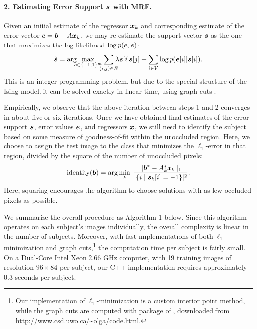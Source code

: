\paragraph{2. Estimating Error Support $\boldsymbol{s}$ with MRF.} 
Given an initial estimate of the regressor ${\boldsymbol{x}}_k$ and corresponding estimate of the error vector $\boldsymbol{e} = \boldsymbol{b} - A {\boldsymbol{x}}_k$, we may re-estimate the support vector $\boldsymbol{s}$ as the one that maximizes the log likelihood $\log p(\boldsymbol{e},\boldsymbol{s})$:\vspace{0mm}
\begin{equation}
\hat{\s} = \arg\hspace{-2mm}\max_{\s \in \{-1,1\}^m}\hspace{-2mm} \sum_{(i,j)\in E} \hspace{-2mm} \lambda \s[i]\s[j] +
\sum_{i\in V} \log p(\e[i] | \s[i]). \vspace{0mm}
\end{equation}
This is an integer programming problem, but due to the special structure of the Ising model, it can be solved exactly in linear time, using graph cuts \cite{Kolmogorov2004-PAMI}.

Empirically, we observe that the above iteration between steps 1 and 2 converges in about five or six iterations. Once we have obtained final estimates of the error support $\boldsymbol{s}$, error values $\boldsymbol{e}$, and regressors ${\boldsymbol{x}}$, we still need to identify the subject based on some measure of goodness-of-fit within the unoccluded region. Here, we choose to assign the test image to the class that minimizes the $\ell_1$-error in that region, divided by the square of the number of unoccluded pixels:\vspace{0mm}
$$\text{identity}(\bb) = \arg \min_k \; \frac{\| \bb^* - A_k^* \x_k \|_1}{|\{ i \mid \s_k[i] = -1 \}|^2}. \vspace{0mm}$$
Here, squaring encourages the algorithm to choose solutions with as few occluded pixels as possible.

We summarize the overall procedure as Algorithm 1 below. Since this algorithm operates on each subject's images individually, the overall complexity is linear in the number of subjects. Moreover, with fast implementations of both $\ell_1$-minimization and graph cuts,\footnote{Our implementation of $\ell_1$-minimization is a custom interior point method, while the graph cuts are computed with package of \cite{Boykov2001-PAMI,Kolmogorov2004-PAMI,Boykov2004-PAMI}, downloaded from \url{http://www.csd.uwo.ca/~olga/code.html}.} the computation time per subject is fairly small. On a Dual-Core Intel Xeon 2.66 GHz computer, with 19 training images of resolution $96 \times 84$ per subject, our C++ implementation requires approximately 0.3 seconds per subject.

